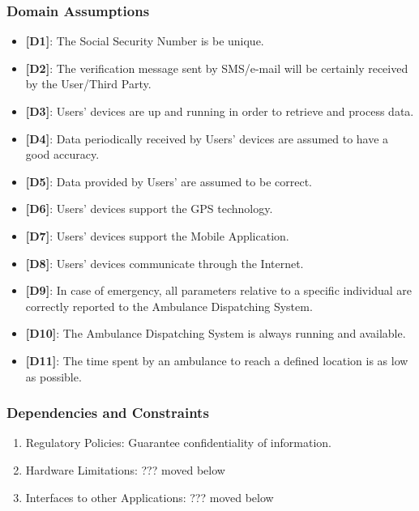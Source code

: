 \documentclass[12pt,a4paper]{article}
\begin{document}
		\subsubsection{Domain Assumptions}
			\begin{itemize} 
				\item {\textbf[}\textbf{D1}{\textbf]}: The Social Security Number is be unique.
				\item {\textbf[}\textbf{D2}{\textbf]}: The verification message sent by SMS/e-mail will be certainly received by the User/Third Party.
				\item {\textbf[}\textbf{D3}{\textbf]}: Users' devices are up and running in order to retrieve and process data.
				\item {\textbf[}\textbf{D4}{\textbf]}: Data periodically received by Users' devices are assumed to have a good accuracy.
				\item {\textbf[}\textbf{D5}{\textbf]}: Data provided by Users' are assumed to be correct.
				\item {\textbf[}\textbf{D6}{\textbf]}: Users' devices support the GPS technology.
				\item {\textbf[}\textbf{D7}{\textbf]}: Users' devices support the Mobile Application.
				\item {\textbf[}\textbf{D8}{\textbf]}: Users' devices communicate through the Internet.
				\item {\textbf[}\textbf{D9}{\textbf]}: In case of emergency, all parameters relative to a specific individual are correctly reported to the Ambulance Dispatching System.
				\item {\textbf[}\textbf{D10}{\textbf]}: The Ambulance Dispatching System is always running and available.
				\item {\textbf[}\textbf{D11}{\textbf]}: The time spent by an ambulance to reach a defined location is as low as possible.
			\end{itemize}
		\subsubsection{Dependencies and Constraints}
			\begin{enumerate}
				\item Regulatory Policies:
				Guarantee confidentiality of information.
				\item Hardware Limitations:  				 ??? moved below
				\item Interfaces to other Applications:  ??? moved below
			\end{enumerate}
	
\end{document}
